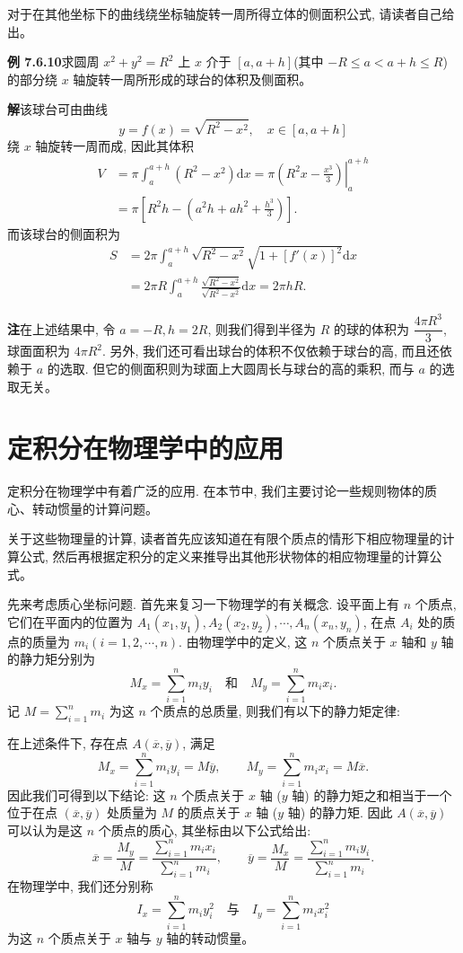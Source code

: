 \documentclass[UTF8, 12pt, fontset=fandol, oneside]{ctexart}
\begin{document}
对于在其他坐标下的曲线绕坐标轴旋转一周所得立体的侧面积公式, 请读者自己给出。

\noindent\textbf{例 7.6.10}\quad 求圆周 $x^2+y^2=R^2$ 上 $x$ 介于 $[a,a+h]$(其中 $-R\leq a<a+h\leq R$) 的部分绕 $x$ 轴旋转一周所形成的球台的体积及侧面积。

\noindent\textbf{解}\quad 该球台可由曲线
\[
  y=f(x)=\sqrt{R^2-x^2},\quad x\in[a,a+h]
\]
绕 $x$ 轴旋转一周而成, 因此其体积
\[
\begin{aligned}
  V&=\pi\int_a^{a+h}(R^2-x^2)\mathrm dx
  =\left.\pi\left(R^2x-\frac{x^3}{3}\right)\right|_a^{a+h}\\
  &=\pi\left[R^2h-\left(a^2h+ah^2+\frac{h^3}{3}\right)\right].
\end{aligned}
\]
而该球台的侧面积为
\[
\begin{aligned}
  S&=2\pi\int_a^{a+h}\sqrt{R^2-x^2}\sqrt{1+[f'(x)]^2}\mathrm dx\\
  &=2\pi R\int_a^{a+h}\frac{\sqrt{R^2-x^2}}{\sqrt{R^2-x^2}}\mathrm dx
  =2\pi hR.
\end{aligned}
\]

\noindent\textbf{注}\quad 在上述结果中, 令 $a=-R,h=2R$, 则我们得到半径为 $R$ 的球的体积为 $\dfrac{4\pi R^3}{3}$, 球面面积为 $4\pi R^2$. 另外, 我们还可看出球台的体积不仅依赖于球台的高, 而且还依赖于 $a$ 的选取. 但它的侧面积则为球面上大圆周长与球台的高的乘积, 而与 $a$ 的选取无关。

\section{定积分在物理学中的应用}

定积分在物理学中有着广泛的应用. 在本节中, 我们主要讨论一些规则物体的质心、转动惯量的计算问题。

关于这些物理量的计算, 读者首先应该知道在有限个质点的情形下相应物理量的计算公式, 然后再根据定积分的定义来推导出其他形状物体的相应物理量的计算公式。

先来考虑质心坐标问题. 首先来复习一下物理学的有关概念. 设平面上有 $n$ 个质点, 它们在平面内的位置为 $A_1(x_1,y_1),A_2(x_2,y_2),\cdots,A_n(x_n,y_n)$, 在点 $A_i$ 处的质点的质量为 $m_i(i=1,2,\cdots,n)$. 由物理学中的定义, 这 $n$ 个质点关于 $x$ 轴和 $y$ 轴的静力矩分别为
\[
  M_x=\sum_{i=1}^n m_i y_i\quad\text{和}\quad M_y=\sum_{i=1}^n m_i x_i.
\]
记 $M=\sum_{i=1}^n m_i$ 为这 $n$ 个质点的总质量, 则我们有以下的静力矩定律:

在上述条件下, 存在点 $A(\overline x,\overline y)$, 满足
\[
  M_x=\sum_{i=1}^n m_i y_i=M\overline y,\qquad
  M_y=\sum_{i=1}^n m_i x_i=M\overline x.
\]
因此我们可得到以下结论: 这 $n$ 个质点关于 $x$ 轴 ($y$ 轴) 的静力矩之和相当于一个位于在点 $(\overline x,\overline y)$ 处质量为 $M$ 的质点关于 $x$ 轴 ($y$ 轴) 的静力矩. 因此 $A(\overline x,\overline y)$ 可以认为是这 $n$ 个质点的质心, 其坐标由以下公式给出:
\[
  \overline x=\frac{M_y}{M}
  =\frac{\sum_{i=1}^n m_i x_i}{\sum_{i=1}^n m_i},\qquad
  \overline y=\frac{M_x}{M}
  =\frac{\sum_{i=1}^n m_i y_i}{\sum_{i=1}^n m_i}.
\]
在物理学中, 我们还分别称
\[
  I_x=\sum_{i=1}^n m_i y_i^2\quad\text{与}\quad I_y=\sum_{i=1}^n m_i x_i^2
\]
为这 $n$ 个质点关于 $x$ 轴与 $y$ 轴的转动惯量。
\end{document}
